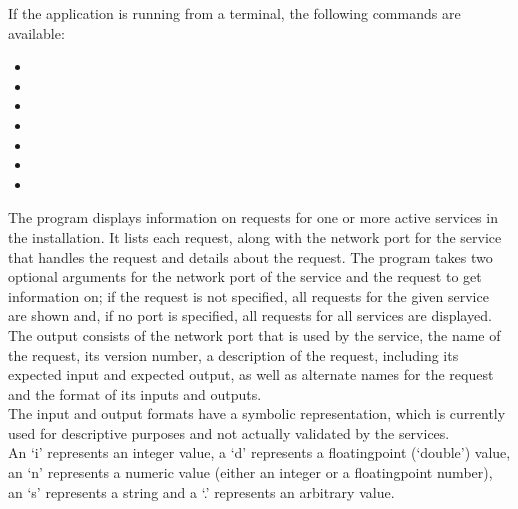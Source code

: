 If the application is running from a terminal, the following commands are available:
\begin{itemize}
\item{}
\item\exSp{}
\item\exSp{}
\item\exSp{}
\item\exSp{}
\item\exSp{}
\item\exSp{}
\end{itemize}
The program  displays information on requests for one or more
active services in the \mplusm{} installation.
It lists each request, along with the \yarp{} network port for the service that handles
the request and details about the request.
The program takes two optional arguments for the \yarp{} network port of the service and
the request to get information on; if the request is not specified, all requests for the
given service are shown and, if no port is specified, all requests for all services are
displayed.\\

The output consists of the \yarp{} network port that is used by the service, the name of
the request, its version number, a description of the request, including its expected
input and expected output, as well as alternate names for the request and the format of
its inputs and outputs.\\

The input and output formats have a symbolic representation, which is currently used for
descriptive purposes and not actually validated by the services.\\

An `i' represents an integer value, a `d' represents a floating\longDash{}point (`double')
value, an `n' represents a numeric value (either an integer or a floating\longDash{}point
number), an `s' represents a string and a `.' represents an arbitrary value.\\

